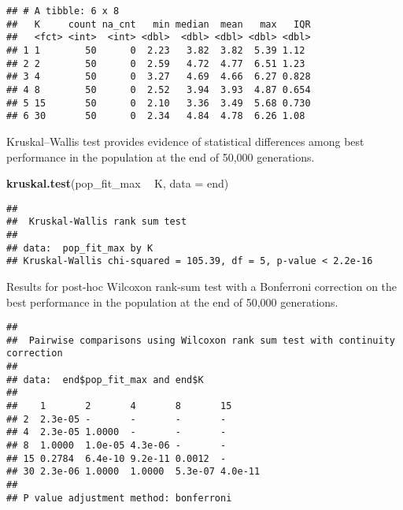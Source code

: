 \documentclass[]{book}
\newenvironment{Shaded}{\begin{snugshade}}{\end{snugshade}}
\newcommand{\DataTypeTok}[1]{\textcolor[rgb]{0.13,0.29,0.53}{#1}}
\newcommand{\KeywordTok}[1]{\textcolor[rgb]{0.13,0.29,0.53}{\textbf{#1}}}
\newcommand{\NormalTok}[1]{#1}
\newcommand{\OperatorTok}[1]{\textcolor[rgb]{0.81,0.36,0.00}{\textbf{#1}}}
\newcommand{\OtherTok}[1]{\textcolor[rgb]{0.56,0.35,0.01}{#1}}
\newcommand{\StringTok}[1]{\textcolor[rgb]{0.31,0.60,0.02}{#1}}
\begin{document}
\begin{verbatim}
## # A tibble: 6 x 8
##   K     count na_cnt   min median  mean   max   IQR
##   <fct> <int>  <int> <dbl>  <dbl> <dbl> <dbl> <dbl>
## 1 1        50      0  2.23   3.82  3.82  5.39 1.12 
## 2 2        50      0  2.59   4.72  4.77  6.51 1.23 
## 3 4        50      0  3.27   4.69  4.66  6.27 0.828
## 4 8        50      0  2.52   3.94  3.93  4.87 0.654
## 5 15       50      0  2.10   3.36  3.49  5.68 0.730
## 6 30       50      0  2.34   4.84  4.78  6.26 1.08
\end{verbatim}

Kruskal--Wallis test provides evidence of statistical differences among best performance in the population at the end of 50,000 generations.

\begin{Shaded}
\begin{Highlighting}[]
\KeywordTok{kruskal.test}\NormalTok{(pop_fit_max }\OperatorTok{~}\StringTok{ }\NormalTok{K, }\DataTypeTok{data =}\NormalTok{ end)}
\end{Highlighting}
\end{Shaded}

\begin{verbatim}
## 
##  Kruskal-Wallis rank sum test
## 
## data:  pop_fit_max by K
## Kruskal-Wallis chi-squared = 105.39, df = 5, p-value < 2.2e-16
\end{verbatim}

Results for post-hoc Wilcoxon rank-sum test with a Bonferroni correction on the best performance in the population at the end of 50,000 generations.

\begin{Shaded}
\end{Shaded}

\begin{verbatim}
## 
##  Pairwise comparisons using Wilcoxon rank sum test with continuity correction 
## 
## data:  end$pop_fit_max and end$K 
## 
##    1       2       4       8       15     
## 2  2.3e-05 -       -       -       -      
## 4  2.3e-05 1.0000  -       -       -      
## 8  1.0000  1.0e-05 4.3e-06 -       -      
## 15 0.2784  6.4e-10 9.2e-11 0.0012  -      
## 30 2.3e-06 1.0000  1.0000  5.3e-07 4.0e-11
## 
## P value adjustment method: bonferroni
\end{verbatim}
\end{document}
